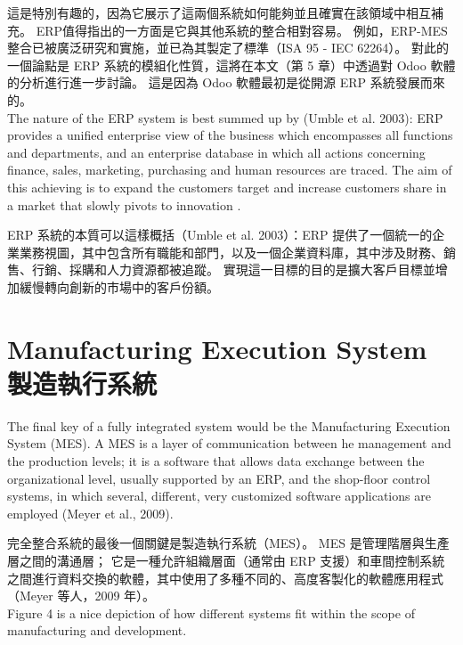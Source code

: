\fontsize{14pt}{5pt}\sectionef
 {這是特別有趣的，因為它展示了這兩個系統如何能夠並且確實在該領域中相互補充。 ERP值得指出的一方面是它與其他系統的整合相對容易。 例如，ERP-MES 整合已被廣泛研究和實施，並已為其製定了標準（ISA 95 - IEC 62264）。 對此的一個論點是 ERP 系統的模組化性質，這將在本文（第 5 章）中透過對 Odoo 軟體的分析進行進一步討論。 這是因為 Odoo 軟體最初是從開源 ERP 系統發展而來的。}\\[15pt]

\fontsize{14pt}{2.5pt}\sectionef 
{The nature of the ERP system is best summed up by (Umble et al. 2003): ERP provides a unified enterprise view of the business which encompasses all functions and departments, and an enterprise database in which all actions concerning finance, sales, marketing, purchasing and human resources are traced. The aim of this achieving is to expand the customers target and increase customers share in a market that slowly pivots to innovation .
}

\fontsize{14pt}{5pt}\sectionef
 {ERP 系統的本質可以這樣概括（Umble et al. 2003）：ERP 提供了一個統一的企業業務視圖，其中包含所有職能和部門，以及一個企業資料庫，其中涉及財務、銷售、行銷、採購和人力資源都被追蹤。 實現這一目標的目的是擴大客戶目標並增加緩慢轉向創新的市場中的客戶份額。}\\[15pt]
\section{Manufacturing Execution System 製造執行系統}


\fontsize{14pt}{2.5pt}\sectionef 
{The final key of a fully integrated system would be the Manufacturing Execution System (MES). A MES is a layer of communication between  he management and the production levels; it is a software that allows data exchange between the organizational level, usually supported by an ERP, and the shop-floor control systems, in which several, different, very customized software applications are employed (Meyer et al., 2009).}

\fontsize{14pt}{5pt}\sectionef
 {完全整合系統的最後一個關鍵是製造執行系統（MES）。 MES 是管理階層與生產層之間的溝通層； 它是一種允許組織層面（通常由 ERP 支援）和車間控制系統之間進行資料交換的軟體，其中使用了多種不同的、高度客製化的軟體應用程式（Meyer 等人，2009 年）。}\\[15pt]

\fontsize{14pt}{2.5pt}\sectionef 
{Figure 4 is a nice depiction of how different systems fit within the scope of manufacturing and development.}

